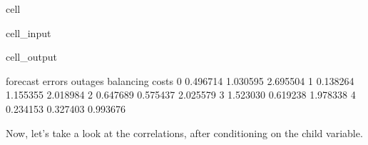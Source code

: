\documentclass[letterpaper,10pt,english]{jupyterBook}
\begin{document}
\begin{sphinxuseclass}{cell}
\begin{sphinxVerbatimInput}
\begin{sphinxuseclass}{cell_input}
\begin{sphinxVerbatim}[commandchars=\\\{\}]
\end{sphinxVerbatim}

\end{sphinxuseclass}\end{sphinxVerbatimInput}
\begin{sphinxVerbatimOutput}

\begin{sphinxuseclass}{cell_output}
\begin{sphinxVerbatim}[commandchars=\\\{\}]
   forecast errors   outages  balancing costs
0         0.496714  1.030595         2.695504
1        \PYGZhy{}0.138264 \PYGZhy{}1.155355        \PYGZhy{}2.018984
2         0.647689  0.575437         2.025579
3         1.523030 \PYGZhy{}0.619238         1.978338
4        \PYGZhy{}0.234153 \PYGZhy{}0.327403        \PYGZhy{}0.993676
\end{sphinxVerbatim}

\end{sphinxuseclass}\end{sphinxVerbatimOutput}

\end{sphinxuseclass}
\sphinxAtStartPar
Now, let’s take a look at the correlations, after conditioning on the child variable.
\end{document}
